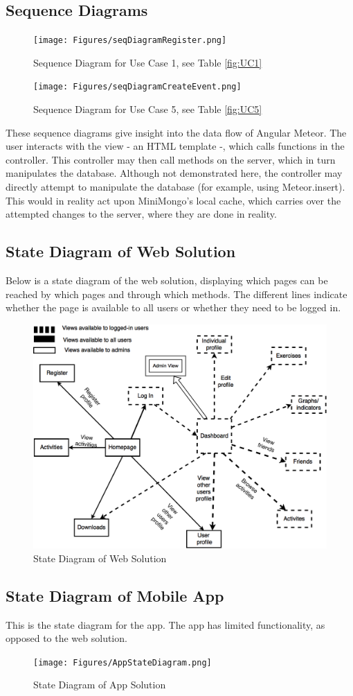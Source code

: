 \subsection{Sequence Diagrams}
\begin{figure}[H]
\centering
  \texttt{[image: Figures/seqDiagramRegister.png]}
  \caption{Sequence Diagram for Use Case 1, see Table \ref{fig:UC1}}
  \label{fig:SeqDig1}
  \end{figure}

\begin{figure}[H]
  \centering
  \texttt{[image: Figures/seqDiagramCreateEvent.png]}
  \caption{Sequence Diagram for Use Case 5, see Table \ref{fig:UC5}}
  \label{fig:SeqDig2}
\end{figure}

These sequence diagrams give insight into the data flow of Angular Meteor. The user interacts with the view - an HTML template -, which calls functions in the controller. This controller may then call methods on the server, which in turn manipulates the database.
Although not demonstrated here, the controller may directly attempt to manipulate the database (for example, using Meteor.insert). This would in reality act upon MiniMongo's local cache, which carries over the attempted changes to the server, where they are done in reality. 
 
\subsection{State Diagram of Web Solution}
Below is a state diagram of the web solution, displaying which pages can be reached by which pages and through which methods. The different lines indicate whether the page is available to all users or whether they need to be logged in.
\begin{figure}[H]
\centering
\includegraphics[scale=0.3]{Figures/StateDiagram.png}
\caption{State Diagram of Web Solution}
\label{fig:WebState}
\end{figure}


\subsection{State Diagram of Mobile App}
This is the state diagram for the app. The app has limited functionality, as opposed to the web solution.

\begin{figure}[H]
\centering
\texttt{[image: Figures/AppStateDiagram.png]}
\caption{State Diagram of App Solution}
\label{fig:AppState}
\end{figure}